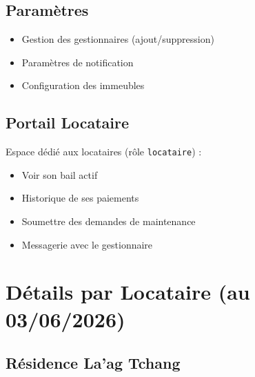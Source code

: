 \documentclass[a4paper,11pt]{article}
\begin{document}
\subsection{Paramètres}

\begin{itemize}
  \item Gestion des gestionnaires (ajout/suppression)
  \item Paramètres de notification
  \item Configuration des immeubles
\end{itemize}

\subsection{Portail Locataire}

Espace dédié aux locataires (rôle \texttt{locataire}) :
\begin{itemize}
  \item Voir son bail actif
  \item Historique de ses paiements
  \item Soumettre des demandes de maintenance
  \item Messagerie avec le gestionnaire
\end{itemize}

\section{Détails par Locataire (au 03/06/2026)}

\subsection{Résidence La'ag Tchang}
\end{document}
